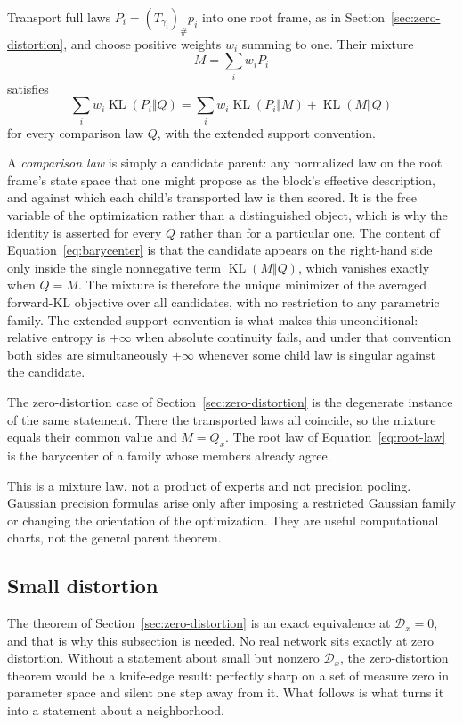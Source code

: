 \documentclass[11pt,letterpaper]{article}
\newcommand{\KL}{\operatorname{KL}}
\begin{document}
Transport full laws \(P_i=(T_{\gamma_i})_{\#}p_i\) into one root frame, as in Section~\ref{sec:zero-distortion}, and choose positive weights \(w_i\) summing to one. Their mixture
\[
  M=\sum_i w_iP_i
\]
satisfies
\begin{equation}
  \sum_iw_i\KL(P_i\Vert Q)
  =
  \sum_iw_i\KL(P_i\Vert M)
  +\KL(M\Vert Q)
  \label{eq:barycenter}
\end{equation}
for every comparison law \(Q\), with the extended support convention.

A \emph{comparison law} is simply a candidate parent: any normalized law on the root frame's state space that one might propose as the block's effective description, and against which each child's transported law is then scored. It is the free variable of the optimization rather than a distinguished object, which is why the identity is asserted for every \(Q\) rather than for a particular one. The content of Equation~\eqref{eq:barycenter} is that the candidate appears on the right-hand side only inside the single nonnegative term \(\KL(M\Vert Q)\), which vanishes exactly when \(Q=M\). The mixture is therefore the unique minimizer of the averaged forward-KL objective over all candidates, with no restriction to any parametric family. The extended support convention is what makes this unconditional: relative entropy is \(+\infty\) when absolute continuity fails, and under that convention both sides are simultaneously \(+\infty\) whenever some child law is singular against the candidate.

The zero-distortion case of Section~\ref{sec:zero-distortion} is the degenerate instance of the same statement. There the transported laws all coincide, so the mixture equals their common value and \(M=Q_x\). The root law of Equation~\eqref{eq:root-law} is the barycenter of a family whose members already agree.

This is a mixture law, not a product of experts and not precision pooling. Gaussian precision formulas arise only after imposing a restricted Gaussian family or changing the orientation of the optimization. They are useful computational charts, not the general parent theorem.

\subsection{Small distortion}
\label{sec:small-distortion}

The theorem of Section~\ref{sec:zero-distortion} is an exact equivalence at \(\mathcal D_x=0\), and that is why this subsection is needed. No real network sits exactly at zero distortion. Without a statement about small but nonzero \(\mathcal D_x\), the zero-distortion theorem would be a knife-edge result: perfectly sharp on a set of measure zero in parameter space and silent one step away from it. What follows is what turns it into a statement about a neighborhood.
\end{document}
